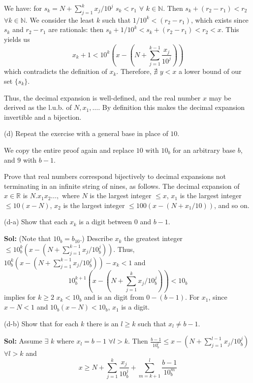 \documentclass{amsart}
\begin{document}
\medskip
\noindent We have: for $s_k = N+\sum_{j=1}^{k}x_j/10^j$ $s_k<r_1$ $\forall$ $k\in\mathbb{N}$. Then 
$s_k + (r_2-r_1)< r_2$ $\forall k\in\mathbb{N}$. We consider the least $k$ such that $1/10^k<(r_2-r_1)$, which exists
since $s_k$ and $r_2-r_1$ are rationals: then $s_k + 1/10^k<s_k+(r_2-r_1)<r_2<x$. This yields us 
$$x_k+1< 10^k(x-(N+\sum^{k-1}_{j=1} \frac{x_j}{10^j}))$$ which contradicts the definition of $x_k$. Therefore, $\nexists$
$y<x$ a lower bound of our set $\{s_k\}$.

\medskip
\noindent Thus, the decimal expansion is well-defined, and the real number $x$ may be derived as the l.u.b. of $N, x_1,\dots$.
By definition this makes the decimal expansion invertible and a bijection.

\bigskip
\indent (d) Repeat the exercise with a general base in place of $10$.

\medskip
\noindent We copy the entire proof again and replace $10$ with $10_b$ for an arbitrary base $b$, and $9$ 
with $b-1$. 

\noindent Prove that real numbers correspond bijectively to decimal expansions not terminating in 
an infinite string of nines, as follows. The decimal expansion of $x\in\mathbb{R}$ is $N.x_1x_2\dots,$ 
where $N$ is the largest integer $\leq x$, $x_1$ is the largest integer $\leq 10(x-N)$, $x_2$ is the
largest integer $\leq 100(x-(N+x_1/10))$, and so on.

\indent (d-a) Show that each $x_k$ is a digit between 0 and $b-1$.

\medskip
\noindent \textbf{Sol:} (Note that $10_b = b_{10}$.) Describe $x_k$ the greatest integer $\leq 10_b^k(x-(N+\sum\limits_{j=1}^{k-1}x_j/10_b^j))$. Thus, 
$10_b^k(x-(N+\sum\limits_{j=1}^{k-1}x_j/10_b^j))-x_k<1$ and $$10_b^{k+1}(x-(N+\sum\limits_{j=1}^kx_j/10_b^j))<10_b$$ implies for $k\geq 2$ $x_k<10_b$ and
is an digit from $0-(b-1)$. For $x_1$, since $x-N<1$ and $10_b(x-N)<10_b$, $x_1$ is a digit.  

\bigskip

\indent (d-b) Show that for each $k$ there is an $l\geq k$ such that $x_l\neq b-1$.

\medskip
\noindent \textbf{Sol:} Assume $\exists$ $k$ where $x_l = b-1$ $\forall l > k$. Then $\frac{b-1}{10_b^l}\leq x-(N+\sum\limits_{j=1}^{l-1}x_j/10_b^j)$ 
$\forall l > k$ and $$x\geq N+\sum\limits^k_{j=1}\frac{x_j}{10_b^j}+\sum\limits^l_{m=k+1}\frac{b-1}{10_b^m}$$ 
\end{document}
